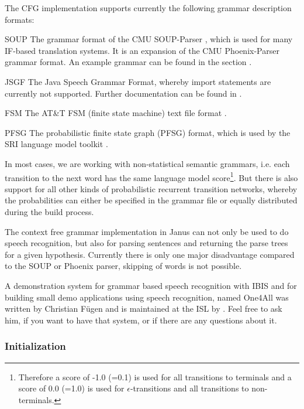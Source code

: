 The CFG implementation supports currently the following grammar
description formats:
\begin{description}
\item{SOUP} The grammar format of the CMU SOUP-Parser
  \cite{gavalda:iwpt00}, which is used for many IF-based translation
  systems. It is an expansion of the CMU Phoenix-Parser
  \cite{ward:icassp91} grammar format. An example grammar can be found
  in the section .
\item{JSGF} The Java Speech Grammar Format, whereby import statements
  are currently not supported. Further documentation can be found in
  \cite{jsgf}.
\item{FSM} The AT\&T FSM (finite state machine) text file format
  \cite{fsm}.
\item{PFSG} The probabilistic finite state graph (PFSG) format, which
  is used by the SRI language model toolkit \cite{srilm}.
\end{description}


In most cases, we are working with non-statistical semantic grammars,
i.e. each transition to the next word has the same language model
score\footnote{Therefore a score of -1.0 (=0.1) is used for all
  transitions to terminals and a score of 0.0 (=1.0) is used for
  $\epsilon$-transitions and all transitions to non-terminals.}. But
there is also support for all other kinds of probabilistic recurrent
transition networks, whereby the probabilities can either be specified
in the grammar file or equally distributed during the build process.

The context free grammar implementation in Janus can not only be used
to do speech recognition, but also for parsing sentences and returning
the parse trees for a given hypothesis. Currently there is only one
major disadvantage compared to the SOUP or Phoenix parser, skipping of
words is not possible.

A demonstration system for grammar based speech recognition with IBIS
and for building small demo applications using speech recognition,
named One4All was written by Christian F\"{u}gen and is maintained at the ISL by
. Feel free to ask him, if you want to
have that system, or if there are any questions about it.

\subsubsection{Initialization}

